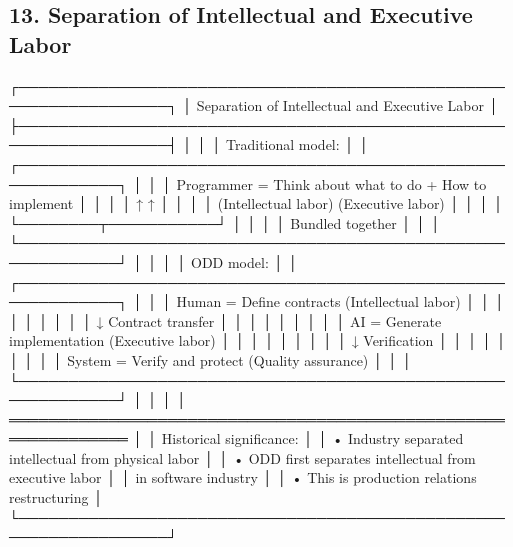 \documentclass[
]{article}
\newenvironment{Shaded}{}{}
\newcommand{\NormalTok}[1]{#1}
\begin{document}
\hypertarget{13-separation-of-intellectual-and-executive-labor}{%
\subsection{13. Separation of Intellectual and Executive
Labor}\label{13-separation-of-intellectual-and-executive-labor}}

\begin{Shaded}
\begin{Highlighting}[]
\NormalTok{┌─────────────────────────────────────────────────────────────────┐}
\NormalTok{│         Separation of Intellectual and Executive Labor           │}
\NormalTok{├─────────────────────────────────────────────────────────────────┤}
\NormalTok{│                                                                  │}
\NormalTok{│  Traditional model:                                             │}
\NormalTok{│  ┌────────────────────────────────────────────────────────────┐ │}
\NormalTok{│  │  Programmer = Think about what to do + How to implement    │ │}
\NormalTok{│  │                       ↑                    ↑                │ │}
\NormalTok{│  │              (Intellectual labor)  (Executive labor)       │ │}
\NormalTok{│  │                       └────────┬───────────┘               │ │}
\NormalTok{│  │                               Bundled together              │ │}
\NormalTok{│  └────────────────────────────────────────────────────────────┘ │}
\NormalTok{│                                                                  │}
\NormalTok{│  ODD model:                                                     │}
\NormalTok{│  ┌────────────────────────────────────────────────────────────┐ │}
\NormalTok{│  │  Human = Define contracts (Intellectual labor)             │ │}
\NormalTok{│  │                              │                              │ │}
\NormalTok{│  │                              ↓ Contract transfer            │ │}
\NormalTok{│  │                              │                              │ │}
\NormalTok{│  │  AI = Generate implementation (Executive labor)            │ │}
\NormalTok{│  │                              │                              │ │}
\NormalTok{│  │                              ↓ Verification                 │ │}
\NormalTok{│  │                              │                              │ │}
\NormalTok{│  │  System = Verify and protect (Quality assurance)           │ │}
\NormalTok{│  └────────────────────────────────────────────────────────────┘ │}
\NormalTok{│                                                                  │}
\NormalTok{│  ══════════════════════════════════════════════════════════════  │}
\NormalTok{│  Historical significance:                                       │}
\NormalTok{│  • Industry separated intellectual from physical labor          │}
\NormalTok{│  • ODD first separates intellectual from executive labor        │}
\NormalTok{│    in software industry                                         │}
\NormalTok{│  • This is production relations restructuring                   │}
\NormalTok{└─────────────────────────────────────────────────────────────────┘}
\end{Highlighting}
\end{Shaded}
\end{document}
